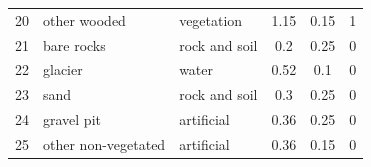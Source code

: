 \documentclass[10pt,letterpaper]{article}
\begin{document}
\begin{table}[!h]
\begin{adjustwidth}{-.1\textwidth}{0cm}
\begin{center}
\begin{tabular}{ c p{} p{} c c c }
        20 & other wooded & vegetation & 1.15 & 0.15 & 1\\
        21 & bare rocks & rock and soil & 0.2 & 0.25 & 0 \\
        22 & glacier & water & 0.52 & 0.1 & 0 \\
        23 & sand & rock and soil & 0.3 & 0.25 & 0 \\
        24 & gravel pit & artificial & 0.36 & 0.25 & 0 \\
        25 & other non-vegetated & artificial & 0.36 & 0.15 & 0 \\
        \bottomrule
      \end{tabular}
    \end{center}
  \end{adjustwidth}
\end{table}
\end{document}
